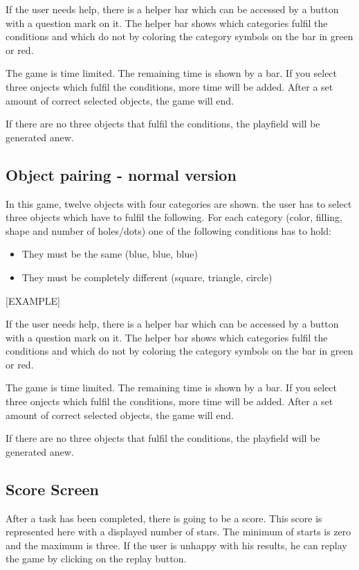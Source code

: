If the user needs help, there is a helper bar which can be accessed by a button with a question mark on it.
The helper bar shows which categories fulfil the conditions and which do not
by coloring the category symbols on the bar in green or red.

The game is time limited. The remaining time is shown by a bar.
If you select three onjects which fulfil the conditions, more time will be added.
After a set amount of correct selected objects, the game will end.

If there are no three objects that fulfil the conditions, the playfield will be generated anew.

\subsection{Object pairing - normal version}
In this game, twelve objects with four categories are shown.
the user has to select three objects which have to fulfil the following.
For each category (color, filling, shape and number of holes/dots) one of the following conditions has to hold:
\begin{itemize}
    \item They must be the same (blue, blue, blue)
    \item They must be completely different (square, triangle, circle)
\end{itemize}
[EXAMPLE]

If the user needs help, there is a helper bar which can be accessed by a button with a question mark on it.
The helper bar shows which categories fulfil the conditions and which do not
by coloring the category symbols on the bar in green or red.

The game is time limited. The remaining time is shown by a bar.
If you select three onjects which fulfil the conditions, more time will be added.
After a set amount of correct selected objects, the game will end.

If there are no three objects that fulfil the conditions, the playfield will be generated anew.

\subsection{Score Screen}
After a task has been completed, there is going to be a score.
This score is represented here with a displayed number of stars.
The minimum of starts is zero and the maximum is three.
If the user is unhappy with his results, he can replay the game by clicking on the replay button.

